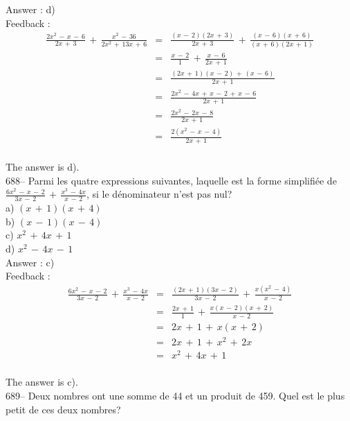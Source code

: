 \documentclass[letterpaper, 12pt]{article}
\begin{document}
Answer : d)\\

Feedback : \\
\begin{eqnarray*}
\frac{2x^{2}\,-\,x\,-\,6}{2x\,+\,3}\,+\,\frac{x^{2}\,-\,36}{2x^{2}\,+\,13x\,+\,6}&=&\frac{(x\,-\,2)(2x\,+\,3)}{2x\,+\,3}\,+\,\frac{(x\,-\,6)(x\,+\,6)}{(x\,+\,6)(2x\,+\,1)}\\[2mm]
&=&\frac{x\,-\,2}{1}\,+\,\frac{x\,-\,6}{2x\,+\,1}\\[2mm]
&=&\frac{(2x\,+\,1)(x\,-\,2)\,+\,(x\,-\,6)}{2x\,+\,1}\\[2mm]
&=&\frac{2x^{2}\,-\,4x\,+\,x\,-\,2\,+\,x\,-\,6}{2x\,+\,1}\\[2mm]
&=&\frac{2x^{2}\,-\,2x\,-\,8}{2x\,+\,1}\\[2mm]
&=&\frac{2(x^{2}\,-\,x\,-\,4)}{2x\,+\,1}\\
\end{eqnarray*}

The answer is d).\\

688-- Parmi les quatre expressions suivantes, laquelle est la forme
simplifi\'ee de
$\frac{6x^{2}\,-\,x\,-\,2}{3x\,-\,2}\,+\,\frac{x^{3}\,-\,4x}{x\,-\,2}$, si
le d\'enominateur n'est pas nul?\\
a) $(x\,+\,1)(x\,+\,4)$\\
b) $(x\,-\,1)(x\,-\,4)$\\
c) $x^{2}\,+\,4x\,+\,1$\\
d) $x^{2}\,-\,4x\,-\,1$\\

Answer : c)\\

Feedback : \\
\begin{eqnarray*}
\frac{6x^{2}\,-\,x\,-\,2}{3x\,-\,2}\,+\,\frac{x^{3}\,-\,4x}{x\,-\,2}&=&\frac{(2x\,+\,1)(3x\,-\,2)}{3x\,-\,2}\,+\,\frac{x(x^{2}\,-\,4)}{x\,-\,2}\\[2mm]
&=&\frac{2x\,+\,1}{1}\,+\,\frac{x(x\,-\,2)(x\,+\,2)}{x\,-\,2}\\[2mm]
&=&2x\,+\,1\,+\,x(x\,+\,2)\\[2mm]
&=&2x\,+\,1\,+\,x^{2}\,+\,2x\\[2mm]
&=&x^{2}\,+\,4x\,+\,1\\
\end{eqnarray*}

The answer is c).\\

689-- Deux nombres ont une somme de 44 et un produit de 459.  Quel est le
plus petit de ces deux nombres?\\
\end{document}
